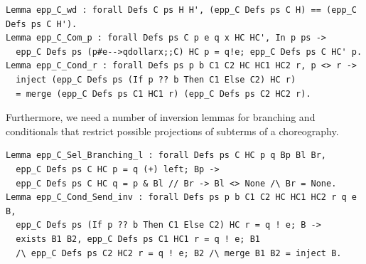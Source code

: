 \documentclass[runningheads]{llncs}
\begin{document}
\begin{lstlisting}
Lemma epp_C_wd : forall Defs C ps H H', (epp_C Defs ps C H) == (epp_C Defs ps C H').
Lemma epp_C_Com_p : forall Defs ps C p e q x HC HC', In p ps ->
  epp_C Defs ps (p#e-->qdollarx;;C) HC p = q!e; epp_C Defs ps C HC' p.
Lemma epp_C_Cond_r : forall Defs ps p b C1 C2 HC HC1 HC2 r, p <> r ->
  inject (epp_C Defs ps (If p ?? b Then C1 Else C2) HC r)
  = merge (epp_C Defs ps C1 HC1 r) (epp_C Defs ps C2 HC2 r).
\end{lstlisting}

Furthermore, we need a number of inversion lemmas for branching and conditionals that restrict
possible projections of subterms of a choreography.

\begin{lstlisting}
Lemma epp_C_Sel_Branching_l : forall Defs ps C HC p q Bp Bl Br,
  epp_C Defs ps C HC p = q (+) left; Bp ->
  epp_C Defs ps C HC q = p & Bl // Br -> Bl <> None /\ Br = None.
Lemma epp_C_Cond_Send_inv : forall Defs ps p b C1 C2 HC HC1 HC2 r q e B,
  epp_C Defs ps (If p ?? b Then C1 Else C2) HC r = q ! e; B ->
  exists B1 B2, epp_C Defs ps C1 HC1 r = q ! e; B1
  /\ epp_C Defs ps C2 HC2 r = q ! e; B2 /\ merge B1 B2 = inject B.
\end{lstlisting}
\end{document}
